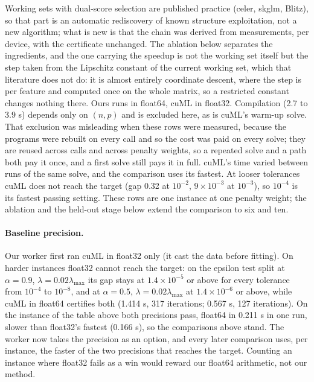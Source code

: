 Working sets with dual-score selection are published practice (celer,
skglm, Blitz), so that part is an automatic rediscovery of known structure
exploitation, not a new algorithm; what is new is that the chain was derived
from measurements, per device, with the certificate unchanged. The ablation
below separates the ingredients, and the one carrying the speedup is not the
working set itself but the step taken from the Lipschitz constant of the
current working set, which that literature does not do: it is almost entirely
coordinate descent, where the step is per feature and computed once on the
whole matrix, so a restricted constant changes nothing there. Ours runs in
float64, cuML in float32. Compilation (2.7 to 3.9 s) depends only on $(n, p)$
and is excluded here, as is cuML's warm-up solve. That exclusion was misleading
when these rows were measured, because the programs were rebuilt on every call
and so the cost was paid on every solve; they are reused across
calls and across penalty weights, so a repeated solve and a path both pay it
once, and a first solve still pays it in full. cuML's time varied between runs of the same solve,
and the comparison uses its fastest. At looser tolerances cuML does not reach
the target (gap 0.32 at $10^{-2}$, $9\times10^{-3}$ at $10^{-3}$), so $10^{-4}$ is its
fastest passing setting. These rows are one instance at one penalty weight; the
ablation and the held-out stage below extend the comparison to six and ten.

\paragraph{Baseline precision.}
Our worker first ran cuML in float32 only (it cast the data before fitting). On
harder instances float32 cannot reach the target: on the epsilon test split at
$\alpha=0.9$, $\lambda=0.02\lambda_{\max}$ its gap stays at $1.4\times10^{-5}$ or
above for every tolerance from $10^{-4}$ to $10^{-8}$, and at $\alpha=0.5$,
$\lambda=0.02\lambda_{\max}$ at $1.4\times10^{-6}$ or above, while cuML in float64
certifies both (1.414 s, 317 iterations; 0.567 s, 127 iterations). On the
instance of the table above both precisions pass, float64 in 0.211 s in one
run, slower than float32's fastest (0.166 s), so the comparisons above stand. The
worker now takes the precision as an option, and every later comparison uses,
per instance, the faster of the two precisions that reaches the target. Counting
an instance where float32 fails as a win would reward our float64 arithmetic,
not our method.


